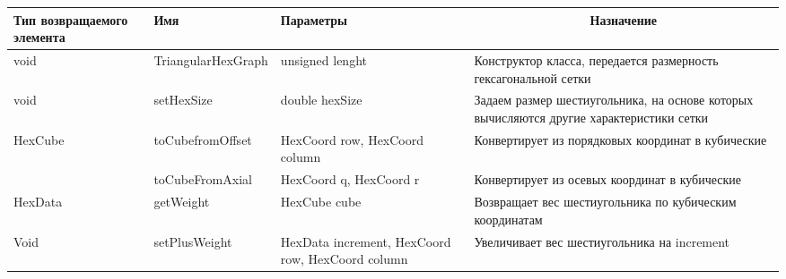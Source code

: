 \begin{longtable}[c]{|p{2.2cm}|p{2.1cm}|p{2.2cm}|p{7.6cm}|}
\hline
\multicolumn{1}{|p{2cm}|}{\textbf{Тип возвращаемого элемента}} & \multicolumn{1}{p{2cm}|}{\textbf{Имя}} & \multicolumn{1}{p{2cm}|}{\textbf{Параме\-тры}} & \multicolumn{1}{c|}{\textbf{Назначение}}                                                                     \\ \hline
\endfirsthead
%
\endhead
%
void                                                      & Trian\-gular\-Hex\-Graph                & unsigned lenght                                                                                                                       & Конструктор класса, передается размерность гексагональной сетки                          \\ \hline
void                                                      & setHex\-Size                        & double hexSize                                                                                                                        & Задаем размер шестиугольника, на основе которых вычисляются другие характеристики сетки  \\ \hline
HexCube                                                   & toCube\-fromOffset                  & HexCoord row, HexCoord column                                                                                                         & Конвертирует из порядковых координат в кубические                                        \\ \hline
                                                          & toCube\-FromAxial                   & HexCoord q, HexCoord r                                                                                                                & Конвертирует из осевых координат в кубические                                            \\ \hline
HexData                                                   & getWeight                         & HexCube cube                                                                                                                          & Возвращает вес шестиугольника по кубическим координатам                                  \\ \hline
Void                                                      & setPlus\-Weight                     & HexData increment, HexCoord row, HexCoord column                                                                                      & Увеличивает вес шестиугольника на increment                                              \\ \hline

\end{longtable}
